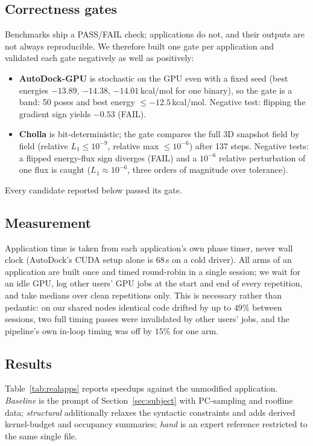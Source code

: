 \subsection{Correctness gates}
Benchmarks ship a PASS/FAIL check; applications do not, and their outputs are not always reproducible.
We therefore built one gate per application and validated each gate negatively as well as positively:
\begin{itemize}\itemsep2pt
  \item \textbf{AutoDock-GPU} is stochastic on the GPU even with a fixed seed (best energies
    $-13.89$, $-14.38$, $-14.01$\,kcal/mol for one binary), so the gate is a band: 50 poses and best
    energy $\le -12.5$\,kcal/mol. Negative test: flipping the gradient sign yields $-0.53$ (FAIL).
  \item \textbf{Cholla} is bit-deterministic; the gate compares the full 3D snapshot field by field
    (relative $L_1 \le 10^{-9}$, relative max $\le 10^{-6}$) after 137 steps. Negative tests: a flipped
    energy-flux sign diverges (FAIL) and a $10^{-6}$ relative perturbation of one flux is caught
    ($L_1 \approx 10^{-6}$, three orders of magnitude over tolerance).
\end{itemize}
Every candidate reported below passed its gate.

\subsection{Measurement}
Application time is taken from each application's own phase timer, never wall clock (AutoDock's CUDA
setup alone is 68\,s on a cold driver). All arms of an application are built once and timed
round-robin in a single session; we wait for an idle GPU, log other users' GPU jobs at the start and
end of every repetition, and take medians over clean repetitions only. This is necessary rather than
pedantic: on our shared nodes identical code drifted by up to $49\%$ between sessions, two full timing
passes were invalidated by other users' jobs, and the pipeline's own in-loop timing was off by $15\%$
for one arm.

\subsection{Results}
Table~\ref{tab:realapps} reports speedups against the unmodified application. \emph{Baseline} is the
prompt of Section~\ref{sec:subject} with PC-sampling and roofline data; \emph{structural} additionally
relaxes the syntactic constraints and adds derived kernel-budget and occupancy summaries; \emph{hand}
is an expert reference restricted to the same single file.


